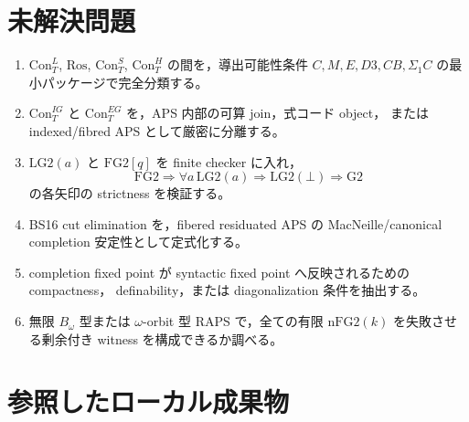 ﻿\documentclass[a4paper,10pt]{ltjsarticle}
\newcommand{\Gtwo}{\mathrm{G2}}
\newcommand{\FGtwo}{\mathrm{FG2}}
\newcommand{\nFGtwo}{\mathrm{nFG2}}
\newcommand{\Con}{\mathrm{Con}}
\newcommand{\Ros}{\mathrm{Ros}}
\newcommand{\Bot}{\bot}
\begin{document}
\section{未解決問題}

\begin{enumerate}
\item \(\Con_T^L\), \(\Ros\), \(\Con_T^S\), \(\Con_T^H\) の間を，導出可能性条件
\(C,M,E,D3,CB,\Sigma_1C\) の最小パッケージで完全分類する。
\item \(\Con_T^{IG}\) と \(\Con_T^{EG}\) を，APS 内部の可算 join，式コード object，
または indexed/fibred APS として厳密に分離する。
\item \(\mathrm{LG2}(a)\) と \(\FGtwo[q]\) を finite checker に入れ，
\[
\FGtwo\Rightarrow \forall a\,\mathrm{LG2}(a)\Rightarrow\mathrm{LG2}(\Bot)\Rightarrow\Gtwo
\]
の各矢印の strictness を検証する。
\item BS16 cut elimination を，fibered residuated APS の MacNeille/canonical completion
安定性として定式化する。
\item completion fixed point が syntactic fixed point へ反映されるための compactness，
definability，または diagonalization 条件を抽出する。
\item 無限 \(B_\omega\) 型または \(\omega\)-orbit 型 RAPS で，全ての有限 \(\nFGtwo(k)\)
を失敗させる剰余付き witness を構成できるか調べる。
\end{enumerate}

\section*{参照したローカル成果物}
\end{document}
